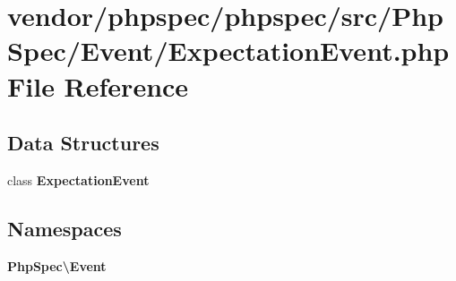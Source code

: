 \section{vendor/phpspec/phpspec/src/\+Php\+Spec/\+Event/\+Expectation\+Event.php File Reference}
\label{_expectation_event_8php}
\subsection*{Data Structures}
\begin{DoxyCompactItemize}
\item 
class {\bf Expectation\+Event}
\end{DoxyCompactItemize}
\subsection*{Namespaces}
\begin{DoxyCompactItemize}
\item 
 {\bf Php\+Spec\textbackslash{}\+Event}
\end{DoxyCompactItemize}
